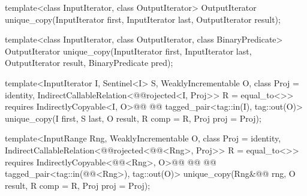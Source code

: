 %
\begin{removedblock}
\begin{itemdecl}
template<class InputIterator, class OutputIterator>
  OutputIterator
    unique_copy(InputIterator first, InputIterator last,
                OutputIterator result);

template<class InputIterator, class OutputIterator,
         class BinaryPredicate>
  OutputIterator
    unique_copy(InputIterator first, InputIterator last,
                OutputIterator result, BinaryPredicate pred);
\end{itemdecl}
\end{removedblock}
\begin{addedblock}
\begin{itemdecl}
template<InputIterator I, Sentinel<I> S, WeaklyIncrementable O,
    class Proj = identity, IndirectCallableRelation<@@rojected<I, Proj>> R = equal_to<>>
  requires IndirectlyCopyable<I, O>@@
    @@
  tagged_pair<tag::in(I), tag::out(O)>
    unique_copy(I first, S last, O result, R comp = R{}, Proj proj = Proj{});

template<InputRange Rng, WeaklyIncrementable O, class Proj = identity,
    IndirectCallableRelation<@@rojected<@@<Rng>, Proj>> R = equal_to<>>
  requires IndirectlyCopyable<@@<Rng>, O>@\newtxt{() \&\&}@
    @@
     @@
  tagged_pair<tag::in(@@<Rng>), tag::out(O)>
    unique_copy(Rng&@\newtxt{\&}@ rng, O result, R comp = R{}, Proj proj = Proj{});
\end{itemdecl}
\end{addedblock}

